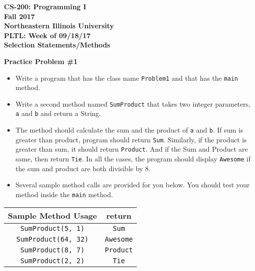 \documentclass[12pt]{article}
\begin{document}
\begin{center}
	\textbf{CS-200: Programming I}\\
	\textbf{Fall 2017}\\
	\textbf{Northeastern Illinois University}\\
	\textbf{PLTL: Week of 09/18/17}\\
	\textbf{Selection Statements/Methods}
\end{center}

\noindent\textbf{Practice Problem \#1}
\begin{itemize}
	\item Write a program that has the class name \texttt{Problem1} and that has the \texttt{main} method.
	\item Write a second method named \texttt{SumProduct} that takes two integer parameters, \texttt{a} and \texttt{b} and return a String.
	\item The method should calculate the sum and the product  of \texttt{a} and \texttt{b}. If sum is greater than product, program should return \texttt{Sum}. Similarly, if the product is greater than sum, it should return \texttt{Product}. And if the Sum and Product are same, then return \texttt{Tie}. In all the cases, the program should display \texttt{Awesome} if the sum and product are both divisible by 8.
	\item Several sample method calls are provided for you below. You should test your method inside the \texttt{main} method.
\end{itemize}
\begin{center}
\begin{tabular}{| c | c |}
\hline\rule{0pt}{4ex}
Sample Method Usage & return \\
\hline\rule{0pt}{4ex}
\texttt{SumProduct(5, 1)} & \texttt{Sum}\\
\hline\rule{0pt}{4ex}
\texttt{SumProduct(64, 32)} & \texttt{Awesome}\\
\hline\rule{0pt}{4ex}
\texttt{SumProduct(8, 7)} & \texttt{Product}\\
\hline\rule{0pt}{4ex}
\texttt{SumProduct(2, 2)} & \texttt{Tie}\\
\hline
\end{tabular}
\end{center}
\end{document}
